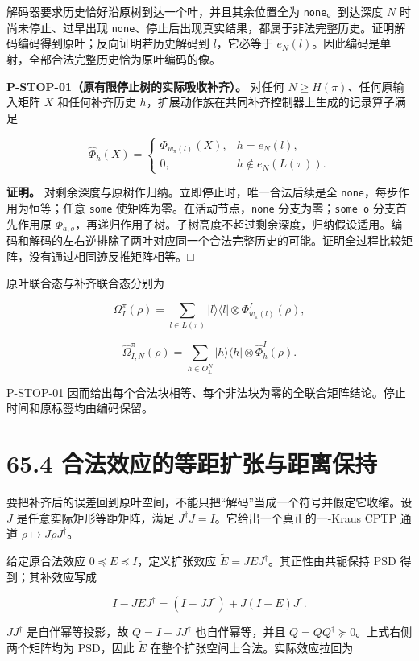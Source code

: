 \documentclass[
  11pt,
  oneside]{book}
\begin{document}
解码器要求历史恰好沿原树到达一个叶，并且其余位置全为
\texttt{none}。到达深度 \(N\) 时尚未停止、过早出现
\texttt{none}、停止后出现真实结果，都属于非法完整历史。证明解码编码得到原叶；反向证明若历史解码到
\(l\)，它必等于
\(e_N(l)\)。因此编码是单射，全部合法完整历史恰为原叶编码的像。

\protect\hypertarget{p-stop-01}{}{}

\textbf{P-STOP-01（原有限停止树的实际吸收补齐）。} 对任何
\(N\ge H(\pi)\)、任何原输入矩阵 \(X\) 和任何补齐历史
\(h\)，扩展动作族在共同补齐控制器上生成的记录算子满足

\[
\widehat\Phi_h(X)=
\begin{cases}
\Phi_{w_\pi(l)}(X),& h=e_N(l),\\
0,&h\notin e_N(L(\pi)).
\end{cases}
\]

\textbf{证明。} 对剩余深度与原树作归纳。立即停止时，唯一合法后续是全
\texttt{none}，每步作用为恒等；任意 \texttt{some}
使矩阵为零。在活动节点，\texttt{none} 分支为零；\texttt{some\ o}
分支首先作用原
\(\Phi_{a,o}\)，再递归作用子树。子树高度不超过剩余深度，归纳假设适用。编码和解码的左右逆排除了两叶对应同一个合法完整历史的可能。证明全过程比较矩阵，没有通过相同迹反推矩阵相等。□

原叶联合态与补齐联合态分别为

\[
\Omega_I^\pi(\rho)
=\sum_{l\in L(\pi)}|l\rangle\langle l|\otimes
\Phi_{w_\pi(l)}^I(\rho),
\]

\[
\widehat\Omega_{I,N}^\pi(\rho)
=\sum_{h\in O_\bot^N}|h\rangle\langle h|\otimes
\widehat\Phi_h^I(\rho).
\]

P-STOP-01
因而给出每个合法块相等、每个非法块为零的全联合矩阵结论。停止时间和原标签均由编码保留。

\section{65.4 合法效应的等距扩张与距离保持}

要把补齐后的误差回到原叶空间，不能只把``解码''当成一个符号并假定它收缩。设
\(J\) 是任意实际矩形等距矩阵，满足
\(J^\dagger J=I\)。它给出一个真正的一-Kraus CPTP 通道
\(\rho\mapsto J\rho J^\dagger\)。

给定原合法效应 \(0\preceq E\preceq I\)，定义扩张效应
\(\widetilde E=JEJ^\dagger\)。其正性由共轭保持 PSD 得到；其补效应写成

\[
I-JEJ^\dagger
=(I-JJ^\dagger)+J(I-E)J^\dagger.
\]

\(JJ^\dagger\) 是自伴幂等投影，故 \(Q=I-JJ^\dagger\) 也自伴幂等，并且
\(Q=QQ^\dagger\succeq0\)。上式右侧两个矩阵均为 PSD，因此
\(\widetilde E\) 在整个扩张空间上合法。实际效应拉回为
\end{document}
